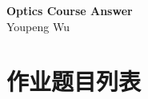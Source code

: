 \documentclass[a4paper]{article}
\newcommand{\TITLE}{Optics Course Answer}
\newcommand{\AUTHOR}{Youpeng Wu}
\begin{document}
\HEADPAGE

\begin{center}
        \Large\textbf{\TITLE}\\
        \vspace*{3mm}
        \normalsize
        \AUTHOR
\end{center}
\vspace*{5mm}
\begin{abstract}
        This is a unofficial answer for optics course in PKU 2025 autumn. This is only for learning and communication. If you have any question, please contact me.
\end{abstract}

\tableofcontents
\newpage
\section{作业题目列表}
\end{document}
